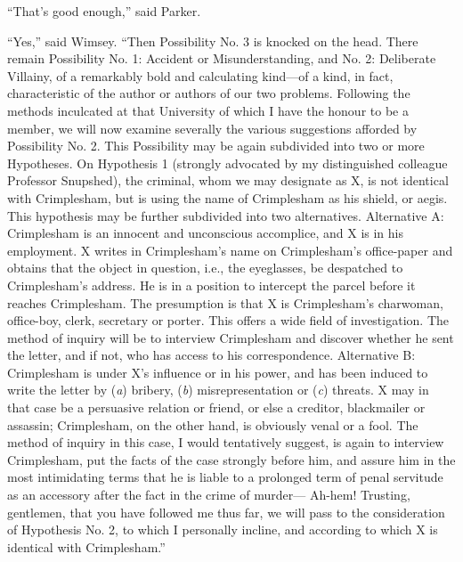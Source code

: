 \enquote{That’s good enough,} said Parker.

\enquote{Yes,} said Wimsey. \enquote{Then Possibility No. 3 is knocked on the head. There remain Possibility No. 1: Accident or Misunderstanding, and No. 2: Deliberate Villainy, of a remarkably bold and calculating kind\allowbreak---\allowbreak of a kind, in fact, characteristic of the author or authors of our two problems. Following the methods inculcated at that University of which I have the honour to be a member, we will now examine severally the various suggestions afforded by Possibility No. 2. This Possibility may be again subdivided into two or more Hypotheses. On Hypothesis 1 (strongly advocated by my distinguished colleague Professor Snupshed), the criminal, whom we may designate as X, is not identical with Crimplesham, but is using the name of Crimplesham as his shield, or aegis. This hypothesis may be further subdivided into two alternatives. Alternative A: Crimplesham is an innocent and unconscious accomplice, and X is in his employment. X writes in Crimplesham’s name on Crimplesham’s office-paper and obtains that the object in question, i.e., the eyeglasses, be despatched to Crimplesham’s address. He is in a position to intercept the parcel before it reaches Crimplesham. The presumption is that X is Crimplesham’s charwoman, office-boy, clerk, secretary or porter. This offers a wide field of investigation. The method of inquiry will be to interview Crimplesham and discover whether he sent the letter, and if not, who has access to his correspondence. Alternative B: Crimplesham is under X’s influence or in his power, and has been induced to write the letter by (\textit{a}) bribery, (\textit{b}) misrepresentation or (\textit{c}) threats. X may in that case be a persuasive relation or friend, or else a creditor, blackmailer or assassin; Crimplesham, on the other hand, is obviously venal or a fool. The method of inquiry in this case, I would tentatively suggest, is again to interview Crimplesham, put the facts of the case strongly before him, and assure him in the most intimidating terms that he is liable to a prolonged term of penal servitude as an accessory after the fact in the crime of murder--- Ah-hem! Trusting, gentlemen, that you have followed me thus far, we will pass to the consideration of Hypothesis No. 2, to which I personally incline, and according to which X is identical with Crimplesham.}


